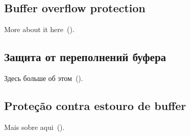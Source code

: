 \ifdefined\ENGLISH
\subsection{Buffer overflow protection}

More about it here~().
\fi

\ifdefined\RUSSIAN
\subsection{Защита от переполнений буфера}

Здесь больше об этом~().
\fi

\ifdefined\BRAZILIAN
\subsection{Proteção contra estouro de buffer}

Mais sobre aqui~().
\fi

